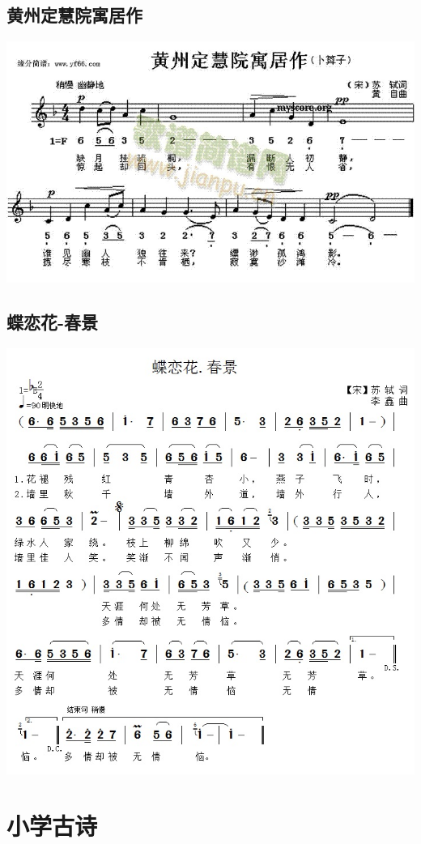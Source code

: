 \documentclass[cn,pad,chinesefont=nofont]{elegantbook}
\begin{document}
\section{黄州定慧院寓居作}
    \includegraphics[width=\textwidth]{dongxiao/20200627-苏轼-黄州定慧院寓居作.jpg} 
\section{蝶恋花-春景}
    \includegraphics[width=\textwidth]{dongxiao/20200411-蝶恋花-春景.jpg}

\chapter{小学古诗}
\end{document}
